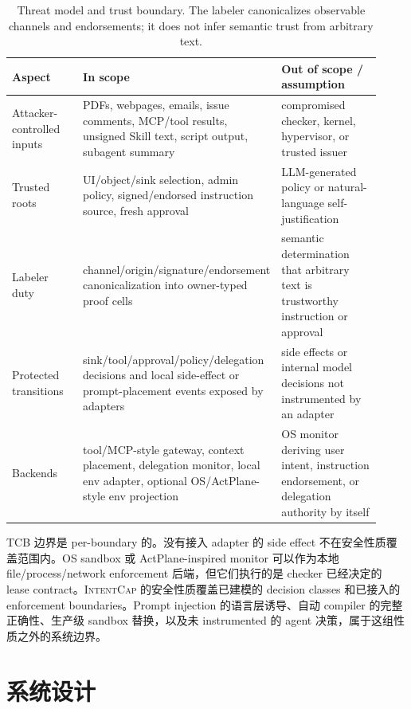 \documentclass[UTF8,a4paper,11pt]{ctexart}
\newcommand{\sys}{\textsc{IntentCap}\xspace}
\begin{document}
\begin{table}[t]
\centering
\scriptsize
\setlength{\tabcolsep}{2pt}
\caption{Threat model and trust boundary. The labeler canonicalizes observable channels and endorsements; it does not infer semantic trust from arbitrary text.}
\label{tab:threat-model}
\begin{tabular}{p{0.22\linewidth}p{0.36\linewidth}p{0.34\linewidth}}
\toprule
Aspect & In scope & Out of scope / assumption \\
\midrule
Attacker-controlled inputs & PDFs, webpages, emails, issue comments, MCP/tool results, unsigned Skill text, script output, subagent summary & compromised checker, kernel, hypervisor, or trusted issuer \\
Trusted roots & UI/object/sink selection, admin policy, signed/endorsed instruction source, fresh approval & LLM-generated policy or natural-language self-justification \\
Labeler duty & channel/origin/signature/endorsement canonicalization into owner-typed proof cells & semantic determination that arbitrary text is trustworthy instruction or approval \\
Protected transitions & sink/tool/approval/policy/delegation decisions and local side-effect or prompt-placement events exposed by adapters & side effects or internal model decisions not instrumented by an adapter \\
Backends & tool/MCP-style gateway, context placement, delegation monitor, local env adapter, optional OS/ActPlane-style env projection & OS monitor deriving user intent, instruction endorsement, or delegation authority by itself \\
\bottomrule
\end{tabular}
\end{table}

TCB 边界是 per-boundary 的。没有接入 adapter 的 side effect 不在安全性质覆盖范围内。OS sandbox 或 ActPlane-inspired monitor 可以作为本地 file/process/network enforcement 后端，但它们执行的是 checker 已经决定的 lease contract。\sys 的安全性质覆盖已建模的 decision classes 和已接入的 enforcement boundaries。Prompt injection 的语言层诱导、自动 compiler 的完整正确性、生产级 sandbox 替换，以及未 instrumented 的 agent 决策，属于这组性质之外的系统边界。

\section{系统设计}
\label{sec:design}
\end{document}
